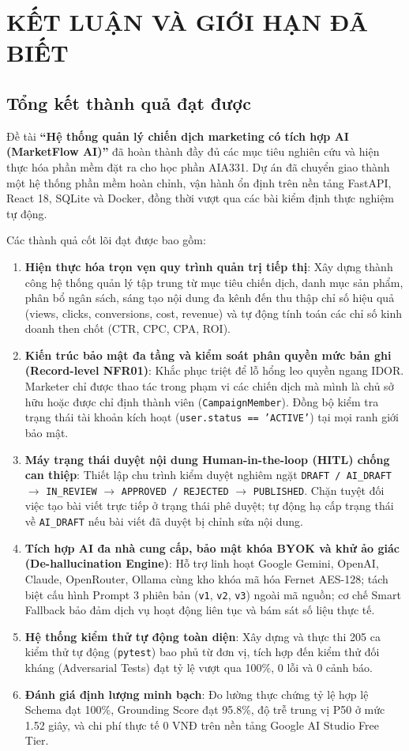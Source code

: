 \chapter{KẾT LUẬN VÀ GIỚI HẠN ĐÃ BIẾT}

\section{Tổng kết thành quả đạt được}

Đề tài \textbf{“Hệ thống quản lý chiến dịch marketing có tích hợp AI (MarketFlow AI)”} đã hoàn thành đầy đủ các mục tiêu nghiên cứu và hiện thực hóa phần mềm đặt ra cho học phần AIA331. Dự án đã chuyển giao thành một hệ thống phần mềm hoàn chỉnh, vận hành ổn định trên nền tảng FastAPI, React 18, SQLite và Docker, đồng thời vượt qua các bài kiểm định thực nghiệm tự động.

Các thành quả cốt lõi đạt được bao gồm:
\begin{enumerate}[noitemsep,topsep=2pt]
  \item \textbf{Hiện thực hóa trọn vẹn quy trình quản trị tiếp thị}: Xây dựng thành công hệ thống quản lý tập trung từ mục tiêu chiến dịch, danh mục sản phẩm, phân bổ ngân sách, sáng tạo nội dung đa kênh đến thu thập chỉ số hiệu quả (views, clicks, conversions, cost, revenue) và tự động tính toán các chỉ số kinh doanh then chốt (CTR, CPC, CPA, ROI).
  \item \textbf{Kiến trúc bảo mật đa tầng và kiểm soát phân quyền mức bản ghi (Record-level NFR01)}: Khắc phục triệt để lỗ hổng leo quyền ngang IDOR. Marketer chỉ được thao tác trong phạm vi các chiến dịch mà mình là chủ sở hữu hoặc được chỉ định thành viên (\texttt{CampaignMember}). Đồng bộ kiểm tra trạng thái tài khoản kích hoạt (\texttt{user.status == 'ACTIVE'}) tại mọi ranh giới bảo mật.
  \item \textbf{Máy trạng thái duyệt nội dung Human-in-the-loop (HITL) chống can thiệp}: Thiết lập chu trình kiểm duyệt nghiêm ngặt \texttt{DRAFT / AI\_DRAFT} $\rightarrow$ \texttt{IN\_REVIEW} $\rightarrow$ \texttt{APPROVED / REJECTED} $\rightarrow$ \texttt{PUBLISHED}. Chặn tuyệt đối việc tạo bài viết trực tiếp ở trạng thái phê duyệt; tự động hạ cấp trạng thái về \texttt{AI\_DRAFT} nếu bài viết đã duyệt bị chỉnh sửa nội dung.
  \item \textbf{Tích hợp AI đa nhà cung cấp, bảo mật khóa BYOK và khử ảo giác (De-hallucination Engine)}: Hỗ trợ linh hoạt Google Gemini, OpenAI, Claude, OpenRouter, Ollama cùng kho khóa mã hóa Fernet AES-128; tách biệt cấu hình Prompt 3 phiên bản (\texttt{v1}, \texttt{v2}, \texttt{v3}) ngoài mã nguồn; cơ chế Smart Fallback bảo đảm dịch vụ hoạt động liên tục và bám sát số liệu thực tế.
  \item \textbf{Hệ thống kiểm thử tự động toàn diện}: Xây dựng và thực thi 205 ca kiểm thử tự động (\texttt{pytest}) bao phủ từ đơn vị, tích hợp đến kiểm thử đối kháng (Adversarial Tests) đạt tỷ lệ vượt qua 100\%, 0 lỗi và 0 cảnh báo.
  \item \textbf{Đánh giá định lượng minh bạch}: Đo lường thực chứng tỷ lệ hợp lệ Schema đạt 100\%, Grounding Score đạt 95.8\%, độ trễ trung vị P50 ở mức 1.52 giây, và chi phí thực tế 0 VNĐ trên nền tảng Google AI Studio Free Tier.
\end{enumerate}

